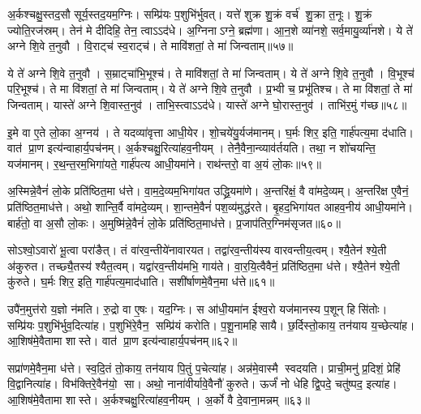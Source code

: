 अ॒र्कश्चक्षु॒स्तद॒सौ सूर्य॒स्तद॒यम॒ग्निः।
सम्प्रि॑यः प॒शुभि॑र्भुवत्।
यत्ते॑ शुक्र शु॒क्रं वर्च॑ शु॒क्रा त॒नूः।
शु॒क्रं ज्योति॒रज॑स्रम्।
तेन॑ मे दीदिहि॒ तेन॒ त्वाऽऽद॑धे।
अ॒ग्निनाऽग्ने॒ ब्रह्म॑णा।
आ॒न॒शे व्या॑नशे॒ सर्व॒मायु॒र्व्या॑नशे।
ये ते॑ अग्ने शि॒वे त॒नुवौ।
वि॒राट्च॑ स्व॒राट्च॑।
ते मावि॑शतां॒ ते मा॑ जिन्वताम्॥५७॥

ये ते॑ अग्ने शि॒वे त॒नुवौ।
स॒म्राट्चा॑भि॒भूश्च॑।
ते मावि॑शतां॒ ते मा॑ जिन्वताम्।
ये ते॑ अग्ने शि॒वे त॒नुवौ।
वि॒भूश्च॑ परि॒भूश्च॑।
ते मा वि॑शतां॒ ते मा॑ जिन्वताम्।
ये ते॑ अग्ने शि॒वे त॒नुवौ।
प्र॒भ्वी च॒ प्रभू॑तिश्च।
ते मा वि॑शतां॒ ते मा॑ जिन्वताम्।
यास्ते॑ अग्ने शि॒वास्त॒नुव॑।
ताभि॒स्त्वाऽऽद॑धे।
यास्ते॑ अग्ने घो॒रास्त॒नुव॑।
ताभि॑र॒मुं ग॑च्छ॥५८॥\anuvakamend[चतु॑ष्पदे जिन्वतां त॒नुव॒स्त्रीणि॑ च]

इ॒मे वा ए॒ते लो॒का अ॒ग्नय॑।
ते यदव्या॑वृत्ता आधी॒येर\sn{}।
शो॒चये॑यु॒र्यज॑मानम्।
घ॒र्मः शिर॒ इति॒ गार्\mbox{}ह॑पत्य॒मा द॑धाति।
वात॑ प्रा॒ण इत्य॑न्वाहार्य॒पच॑नम्।
अ॒र्कश्चक्षु॒रित्या॑हव॒नीयम्।
तेनै॒वैना॒न्व्याव॑र्तयति।
तथा॒ न शो॑चयन्ति॒ यज॑मानम्।
र॒थ॒न्त॒रम॒भिगा॑यते॒ गार्\mbox{}ह॑पत्य आधी॒यमा॑ने।
राथ॑न्तरो॒ वा अ॒यं लो॒कः॥५९॥

अ॒स्मिन्ने॒वैनं॑ लो॒के प्रति॑ष्ठित॒मा ध॑त्ते।
वा॒म॒दे॒व्यम॒भिगा॑यत उद्ध्रि॒यमा॑णे।
अ॒न्तरि॑क्षं॒ वै वा॑मदे॒व्यम्।
अ॒न्तरि॑क्ष ए॒वैनं॒ प्रति॑ष्ठित॒माध॑त्ते।
अथो॒ शान्ति॒र्वै वा॑मदे॒व्यम्।
शा॒न्तमे॒वैनं॑ पश॒व्य॑मुद्ध॑रते।
बृ॒हद॒भिगा॑यत आहव॒नीय॑ आधी॒यमा॑ने।
बार्\mbox{}ह॑तो॒ वा अ॒सौ लो॒कः।
अ॒मुष्मि॑न्ने॒वैनं॑ लो॒के प्रति॑ष्ठित॒माध॑त्ते।
प्र॒जाप॑तिर॒ग्निम॑सृजत॥६०॥

सोऽश्वो॒ऽवारो॑ भू॒त्वा परा॑ङैत्।
तं वा॑रव॒न्तीये॑नावारयत।
तद्वा॑रव॒न्तीय॑स्य वारवन्तीय॒त्वम्।
श्यै॒तेन॑ श्ये॒ती अ॑कुरुत।
तच्छ्यै॒तस्य॑ श्यैत॒त्वम्।
यद्वा॑रव॒न्तीय॑मभि॒ गाय॑ते।
वा॒र॒यि॒त्वैवैनं॒ प्रति॑ष्ठित॒मा ध॑त्ते।
श्यै॒तेन॑ श्ये॒ती कु॑रुते।
घ॒र्मः शिर॒ इति॒ गार्\mbox{}ह॑पत्य॒माद॑धाति।
सशी॑र्\mbox{}षाणमे॒वैन॒मा ध॑त्ते॥६१॥

उपै॑न॒मुत्त॑रो य॒ज्ञो न॑मति।
रु॒द्रो वा ए॒षः।
यद॒ग्निः।
स आ॑धी॒यमा॑न ईश्व॒रो यज॑मानस्य प॒शून् हिसि॑तोः।
सम्प्रि॑यः प॒शुभि॑र्भुव॒दित्या॑ह।
प॒शुभि॑रे॒वैन॒ सम्प्रि॑यं करोति।
प॒शू॒नामहिसायै।
छ॒र्दिस्तो॒काय॒ तन॑याय य॒च्छेत्या॑ह।
आ॒शिष॑मे॒वैतामा शास्ते।
वात॑ प्रा॒ण इत्य॑न्वाहार्य॒पच॑नम्॥६२॥

सप्रा॑णमे॒वैन॒मा ध॑त्ते।
स्व॒दि॒तं तो॒काय॒ तन॑याय पि॒तुं प॒चेत्या॑ह।
अन्न॑मे॒वास्मै स्वदयति।
प्राची॒मनु॑ प्र॒दिशं॒ प्रेहि॑ वि॒द्वानित्या॑ह।
विभ॑क्तिरे॒वैन॑यो॒ सा।
अथो॒ नाना॑वीर्यावे॒वैनौ॑ कुरुते।
ऊर्जं॑ नो धेहि द्वि॒पदे॒ चतु॑ष्पद॒ इत्या॑ह।
आ॒शिष॑मे॒वैतामा शास्ते।
अ॒र्कश्चक्षु॒रित्या॑हव॒नीयम्।
अ॒र्को वै दे॒वाना॒मन्नम्॥६३॥

